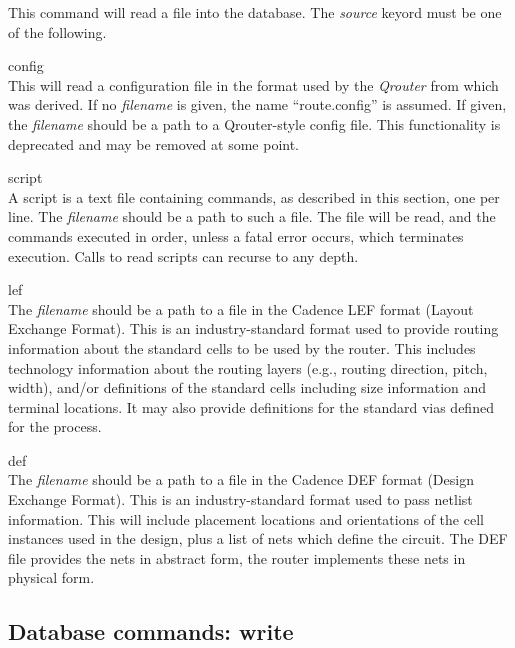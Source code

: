 This command will read a file into the database.  The {\it source}
keyord must be one of the following.
\begin{description}
\item{\vt config}\\
This will read a configuration file in the format used by the {\it
Qrouter} from which {\MRouter} was derived.  If no {\it filename} is
given, the name ``{\vt route.config}'' is assumed.  If given, the {\it
filename} should be a path to a Qrouter-style config file.  This
functionality is deprecated and may be removed at some point.

\item{\vt script}\\
A script is a text file containing commands, as described in this
section, one per line.  The {\it filename} should be a path to such a
file.  The file will be read, and the commands executed in order,
unless a fatal error occurs, which terminates execution.  Calls to
read scripts can recurse to any depth.

\item{\vt lef}\\
The {\it filename} should be a path to a file in the Cadence LEF
format (Layout Exchange Format).  This is an industry-standard format
used to provide routing information about the standard cells to be
used by the router.  This includes technology information about the
routing layers (e.g., routing direction, pitch, width), and/or
definitions of the standard cells including size information and
terminal locations.  It may also provide definitions for the standard
vias defined for the process.

\item{\vt def}\\
The {\it filename} should be a path to a file in the Cadence DEF
format (Design Exchange Format).  This is an industry-standard format
used to pass netlist information.  This will include placement
locations and orientations of the cell instances used in the design,
plus a list of nets which define the circuit.  The DEF file provides
the nets in abstract form, the router implements these nets in
physical form.
\end{description}

\subsection{Database commands: {\vt write}}

